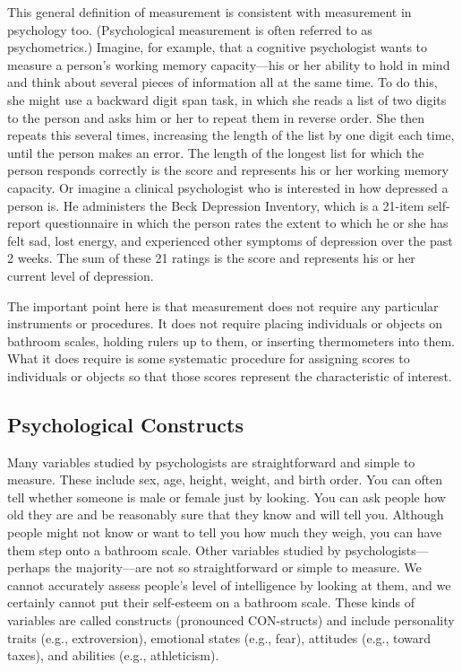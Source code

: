 This general definition of measurement is consistent with measurement in psychology too. (Psychological measurement is often referred to as psychometrics.) Imagine, for example, that a cognitive psychologist wants to measure a person's working memory capacity—his or her ability to hold in mind and think about several pieces of information all at the same time. To do this, she might use a backward digit span task, in which she reads a list of two digits to the person and asks him or her to repeat them in reverse order. She then repeats this several times, increasing the length of the list by one digit each time, until the person makes an error. The length of the longest list for which the person responds correctly is the score and represents his or her working memory capacity. Or imagine a clinical psychologist who is interested in how depressed a person is. He administers the Beck Depression Inventory, which is a 21-item self-report questionnaire in which the person rates the extent to which he or she has felt sad, lost energy, and experienced other symptoms of depression over the past 2 weeks. The sum of these 21 ratings is the score and represents his or her current level of depression.


The important point here is that measurement does not require any particular instruments or procedures. It does not require placing individuals or objects on bathroom scales, holding rulers up to them, or inserting thermometers into them. What it does require is some systematic procedure for assigning scores to individuals or objects so that those scores represent the characteristic of interest.



\subsection{Psychological Constructs}


Many variables studied by psychologists are straightforward and simple to measure. These include sex, age, height, weight, and birth order. You can often tell whether someone is male or female just by looking. You can ask people how old they are and be reasonably sure that they know and will tell you. Although people might not know or want to tell you how much they weigh, you can have them step onto a bathroom scale. Other variables studied by psychologists—perhaps the majority—are not so straightforward or simple to measure. We cannot accurately assess people's level of intelligence by looking at them, and we certainly cannot put their self-esteem on a bathroom scale. These kinds of variables are called constructs (pronounced CON-structs) and include personality traits (e.g., extroversion), emotional states (e.g., fear), attitudes (e.g., toward taxes), and abilities (e.g., athleticism).


